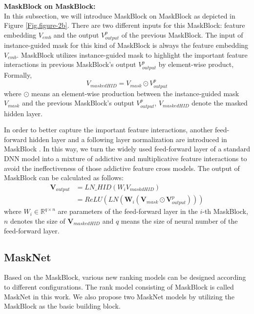 \documentclass[sigconf]{acmart}
\begin{document}
\noindent\textbf{MaskBlock on MaskBlock:}\\
In this subsection, we will introduce MaskBlock on MaskBlock as depicted in Figure \ref{Fig.figure-2b}. There are two different inputs for this MaskBlock: feature embedding $V_{emb}$ and the output $V_{output}^{p}$ of the previous MaskBlock. The input of instance-guided mask for this kind of MaskBlock is always the feature embedding $V_{emb}$. MaskBlock utilizes instance-guided mask to highlight the important feature interactions in previous MaskBlock's output $V_{output}^p$ by element-wise product, Formally,
\begin{equation}
  V_{maskedHID} = V_{mask} \odot V_{output}^p
\end{equation}
 where $\odot$ means an element-wise production between the instance-guided mask  $V_{mask}$ and the previous MaskBlock's output $V_{output}^p$, $V_{maskedHID}$ denote the masked hidden layer.


In order to better capture the important feature interactions, another feed-forward hidden layer and a following layer normalization are introduced in MaskBlock . In this way, we turn the widely used feed-forward layer of a standard DNN model into a mixture of addictive and multiplicative feature interactions to avoid the ineffectiveness of those addictive feature cross models.  The output of MaskBlock can be calculated as follows:
\begin{equation}
  \begin{split}
\mathbf{V}_{output} &= LN\_HID(W_iV_{maskdHID}) \\
&= ReLU(LN(\mathbf{W}_i(\mathbf{V}_{mask} \odot \mathbf{V}_{output}^p)))
\end{split}
\end{equation}
where $W_i \in \mathbb{R}^{q\times n}$ are parameters of the feed-forward layer in the $i$-th MaskBlock, $n$ denotes the size of $\mathbf{V}_{maskedHID}$ and $q$ means the size of neural number of the feed-forward layer.








\subsection{MaskNet}

Based on the MaskBlock, various new ranking models can be designed according to different configurations.  The rank model consisting of MaskBlock is called MaskNet in this work. We also propose two MaskNet models by utilizing the MaskBlock as the basic building block.
\end{document}
